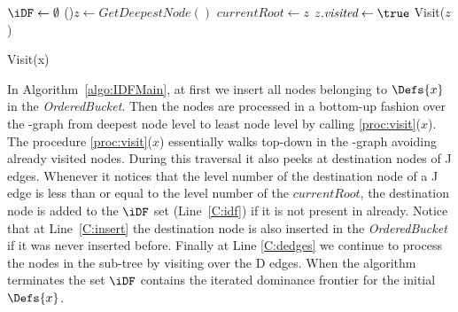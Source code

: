 {\begin{algorithm}

  $\iDF \gets \emptyset$\;
  \While(){$z \gets \textit{GetDeepestNode}()$}{  \label{C:get} 
    $\textit{currentRoot} \gets z$\;
    $z.\textit{visited} \gets \true$\;
    Visit($z$)
  }
\end{algorithm}


\begin{procedure}
  \caption{Visit(x)}
  \label{proc:visit}
\end{procedure}

In Algorithm~\ref{algo:IDFMain}, at first we insert all nodes belonging to $\Defs{x}$ in the 
\textit{OrderedBucket}. Then the nodes are processed
in a bottom-up fashion over the \DJ-graph from deepest node level to least node level
by calling \ref{proc:visit}($x$). The procedure \ref{proc:visit}($x$) essentially 
walks top-down in the  \DJ-graph avoiding already visited nodes. During this 
traversal it also peeks at destination nodes of J edges. Whenever it notices 
that the level number of the destination node of a J edge is less than or equal 
to the level number of the $\textit{currentRoot}$, the destination node is 
added to the $\iDF$ set (Line~\ref{C:idf}) if it is not present in \iDF already. 
Notice that at Line~\ref{C:insert} the destination node is also inserted in the 
{\it OrderedBucket} if it was never inserted before. Finally at Line 
\ref{C:dedges} we continue to process the nodes in the sub-tree by visiting 
over the D edges. When the algorithm terminates the 
set $\iDF$ contains the iterated dominance frontier for the initial $\Defs{x}$.

}
